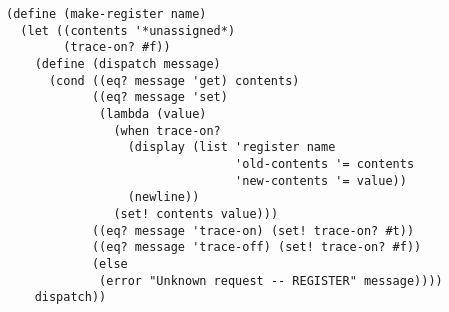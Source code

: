 \documentclass[a4paper,12pt]{article}
\begin{document}
\begin{lstlisting}
(define (make-register name)
  (let ((contents '*unassigned*)
        (trace-on? #f))
    (define (dispatch message)
      (cond ((eq? message 'get) contents)
            ((eq? message 'set)
             (lambda (value)
               (when trace-on?
                 (display (list 'register name
                                'old-contents '= contents
                                'new-contents '= value))
                 (newline))
               (set! contents value)))
            ((eq? message 'trace-on) (set! trace-on? #t))
            ((eq? message 'trace-off) (set! trace-on? #f))
            (else
             (error "Unknown request -- REGISTER" message))))
    dispatch))
\end{lstlisting}
\end{document}
